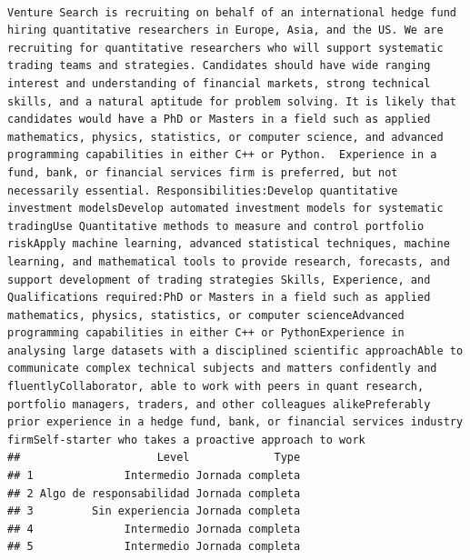 \documentclass[
]{article}
\begin{document}
\begin{verbatim}
                                                                                                                                                                                                                                                                                                                                                                                                                                                                                                                                                                                                                                                                                                                                       Venture Search is recruiting on behalf of an international hedge fund hiring quantitative researchers in Europe, Asia, and the US. We are recruiting for quantitative researchers who will support systematic trading teams and strategies. Candidates should have wide ranging interest and understanding of financial markets, strong technical skills, and a natural aptitude for problem solving. It is likely that candidates would have a PhD or Masters in a field such as applied mathematics, physics, statistics, or computer science, and advanced programming capabilities in either C++ or Python.  Experience in a fund, bank, or financial services firm is preferred, but not necessarily essential. Responsibilities:Develop quantitative investment modelsDevelop automated investment models for systematic tradingUse Quantitative methods to measure and control portfolio riskApply machine learning, advanced statistical techniques, machine learning, and mathematical tools to provide research, forecasts, and support development of trading strategies Skills, Experience, and Qualifications required:PhD or Masters in a field such as applied mathematics, physics, statistics, or computer scienceAdvanced programming capabilities in either C++ or PythonExperience in analysing large datasets with a disciplined scientific approachAble to communicate complex technical subjects and matters confidently and fluentlyCollaborator, able to work with peers in quant research, portfolio managers, traders, and other colleagues alikePreferably prior experience in a hedge fund, bank, or financial services industry firmSelf-starter who takes a proactive approach to work
##                     Level             Type
## 1              Intermedio Jornada completa
## 2 Algo de responsabilidad Jornada completa
## 3         Sin experiencia Jornada completa
## 4              Intermedio Jornada completa
## 5              Intermedio Jornada completa

\end{verbatim}
\end{document}
